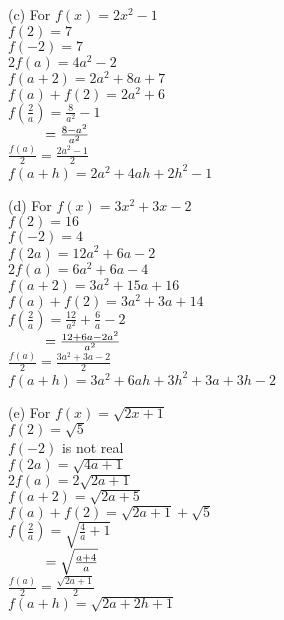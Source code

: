 \begin{enumialphparenastyle}
\begin{multicols}{2}
\begin{ex}
\begin{sol}
\vspace{3mm} 

(c) \hspace{2mm} For $f(x) = 2x^2-1$\\
$f(2) = 7$\\
$f(-2) = 7$\\
$2 f(a) = 4a^2-2$\\
$f(a+2) = 2a^2+8a+7$\\
$f(a) + f(2) = 2a^2+6$\\
$f \left( \frac{2}{a} \right) = \frac{8}{a^2} - 1$ \\
$\hphantom{f \left( \frac{2}{a} \right)} = \frac{8-a^2}{a^2}$\\
$\frac{f(a)}{2} =  \frac{2a^2-1}{2}$\\
$f(a + h) = 2a^2+4ah+2h^2-1$\\
		
\vspace{2mm}

(d) \hspace{2mm} For $f(x) = 3x^2+3x-2$\\
$f(2) = 16$\\
$f(-2) = 4$\\
$f(2a) = 12a^2+6a-2$\\
$2 f(a) = 6a^2+6a-4$\\
$f(a+2) = 3a^2+15a+16$\\
\small $f(a) + f(2) = 3a^2+3a+14$ \normalsize\\
$f \left( \frac{2}{a} \right) = \frac{12}{a^2} + \frac{6}{a} - 2$ \\
$\hphantom{f \left( \frac{2}{a} \right)} = \frac{12+6a-2a^2}{a^2}$\\
$\frac{f(a)}{2} =  \frac{3a^2+3a-2}{2}$\\
$f(a + h) = 3a^2 + 6ah + 3h^2+3a+3h-2$\\
		
\vspace{3mm}	

(e) \hspace{2mm} For $f(x) = \sqrt{2x+1}$\\
$f(2) = \sqrt{5}$\\
$f(-2)$ is not real \\
$f(2a) = \sqrt{4a+1}$\\
$2 f(a) = 2\sqrt{2a+1}$\\
$f(a+2) = \sqrt{2a+5}$\\
\small $f(a) + f(2) =\sqrt{2a+1} + \sqrt{5}$ \normalsize\\
$f \left( \frac{2}{a} \right) = \sqrt{\frac{4}{a} + 1}$ \\
$\hphantom{f \left( \frac{2}{a} \right)} = \sqrt{\frac{a+4}{a}}$\\
$\frac{f(a)}{2} = \frac{\sqrt{2a+1}}{2}$\\
$f(a + h) = \sqrt{2a+2h+1}$\\


\end{sol}
\end{ex}
\end{multicols}
\end{enumialphparenastyle}
